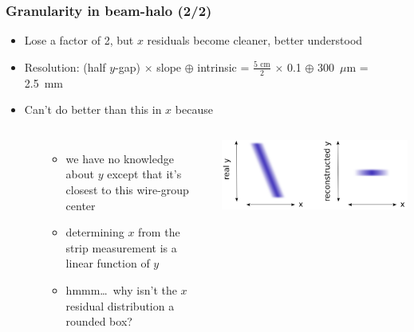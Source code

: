 \documentclass[compress]{beamer}
\begin{document}
\begin{frame}
\begin{columns}
\end{columns}
\end{frame}

\begin{frame}
\frametitle{Granularity in beam-halo (2/2)}
\scriptsize

\begin{itemize}
\item Lose a factor of 2, but $x$ residuals become cleaner, better understood
\item Resolution: (half $y$-gap) $\times$ slope $\oplus$ intrinsic = $\frac{\mbox{5~cm}}{2}$ $\times$ 0.1 $\oplus$ 300~$\mu$m = \mbox{2.5~mm \hspace{-1 cm}}
\item Can't do better than this in $x$ because
\begin{columns}
\mbox{ }

\begin{itemize}\setlength{\itemsep}{-0.1 cm}
\item \scriptsize we have no knowledge about $y$ except that it's closest to this wire-group center
\item \scriptsize determining $x$ from the strip measurement is a linear function of $y$
\item \scriptsize hmmm\ldots\ why isn't the $x$ residual distribution a rounded box?
\end{itemize}
\includegraphics[width=\linewidth]{ignorance_of_y.png}
\end{columns}
\end{itemize}


\end{frame}
\end{document}
